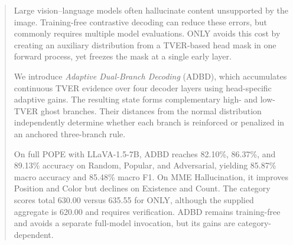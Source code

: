 \begin{abstract}
Large vision--language models often hallucinate content unsupported by the image. Training-free contrastive decoding can reduce these errors, but commonly requires multiple model evaluations. ONLY avoids this cost by creating an auxiliary distribution from a TVER-based head mask in one forward process, yet freezes the mask at a single early layer.

We introduce \emph{Adaptive Dual-Branch Decoding} (ADBD), which accumulates continuous TVER evidence over four decoder layers using head-specific adaptive gains. The resulting state forms complementary high- and low-TVER ghost branches. Their distances from the normal distribution independently determine whether each branch is reinforced or penalized in an anchored three-branch rule.

On full POPE with LLaVA-1.5-7B, ADBD reaches 82.10\%, 86.37\%, and 89.13\% accuracy on Random, Popular, and Adversarial, yielding 85.87\% macro accuracy and 85.48\% macro F1. On MME Hallucination, it improves Position and Color but declines on Existence and Count. The category scores total 630.00 versus 635.55 for ONLY, although the supplied aggregate is 620.00 and requires verification. ADBD remains training-free and avoids a separate full-model invocation, but its gains are category-dependent.
\end{abstract}
